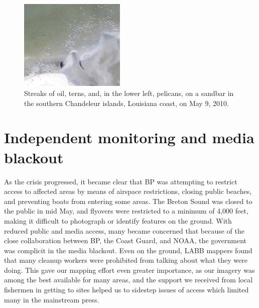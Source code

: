 \documentclass[11pt,oneside,notitlepage]{report}
\begin{document}
{{\begin{figure}
	\begin{flushright}
		\includegraphics[width=0.45\textwidth]{images/birds-chandeleur.png}
		\caption{Streaks of oil, terns, and, in the lower left, pelicans, on a sandbar in the southern Chandeleur islands, Louisiana coast, on May 9, 2010.}
	\end{flushright}
\end{figure}

\section{Independent monitoring and media blackout}

As the crisis progressed, it became clear that BP was attempting to restrict access to affected areas by means of airspace restrictions, closing public beaches, and preventing boats from entering some areas. The Breton Sound was closed to the public in mid May, and flyovers were restricted to a minimum of 4,000 feet, making it difficult to photograph or identify features on the ground. \cite{peters2010efforts} With reduced public and media access, many became concerned that because of the close collaboration between BP, the Coast Guard, and NOAA, the government was complicit in the media blackout. Even on the ground, \ac{LABB} mappers found that many cleanup workers were prohibited from talking about what they were doing. \cite{dosemagen2010heywhat} This gave our mapping effort even greater importance, as our imagery was among the best available for many areas, and the support we received from local fishermen in getting to sites helped us to sidestep issues of access which limited many in the mainstream press.

}}
\end{document}
